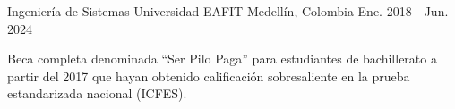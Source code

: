 

\begin{cventries}

  \cventry
    {Ingeniería de Sistemas} %
    {Universidad EAFIT} %
    {Medellín, Colombia} %
    {Ene. 2018 - Jun. 2024} %
    {
      \begin{cvitems} %
        \item {Beca completa denominada “Ser Pilo Paga” para estudiantes de bachillerato a partir del 2017 que hayan obtenido calificación sobresaliente en la prueba estandarizada nacional (ICFES).}
      \end{cvitems}
    }

\end{cventries}
